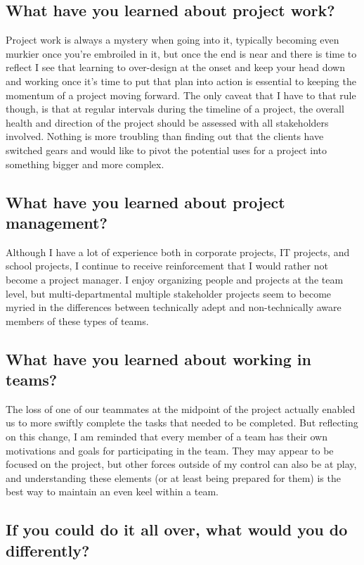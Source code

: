 \documentclass[11pt]{scrreprt}
\begin{document}
\subsection{What have you learned about project work?}

Project work is always a mystery when going into it, typically becoming even murkier once you're embroiled in it, but once the end is near and there is time to reflect I see that learning to over-design at the onset and keep your head down and working once it's time to put that plan into action is essential to keeping the momentum of a project moving forward.
The only caveat that I have to that rule though, is that at regular intervals during the timeline of a project, the overall health and direction of the project should be assessed with all stakeholders involved. Nothing is more troubling than finding out that the clients have switched gears and would like to pivot the potential uses for a project into something bigger and more complex.

\subsection{What have you learned about project management?}

Although I have a lot of experience both in corporate projects, IT projects, and school projects, I continue to receive reinforcement that I would rather not become a project manager. I enjoy organizing people and projects at the team level, but multi-departmental multiple stakeholder projects seem to become myried in the differences between technically adept and non-technically aware members of these types of teams.

\subsection{What have you learned about working in teams?}

The loss of one of our teammates at the midpoint of the project actually enabled us to more swiftly complete the tasks that needed to be completed.
But reflecting on this change, I am reminded that every member of a team has their own motivations and goals for participating in the team.
They may appear to be focused on the project, but other forces outside of my control can also be at play, and understanding these elements (or at least being prepared for them) is the best way to maintain an even keel within a team.

\subsection{If you could do it all over, what would you do differently?}
\end{document}
